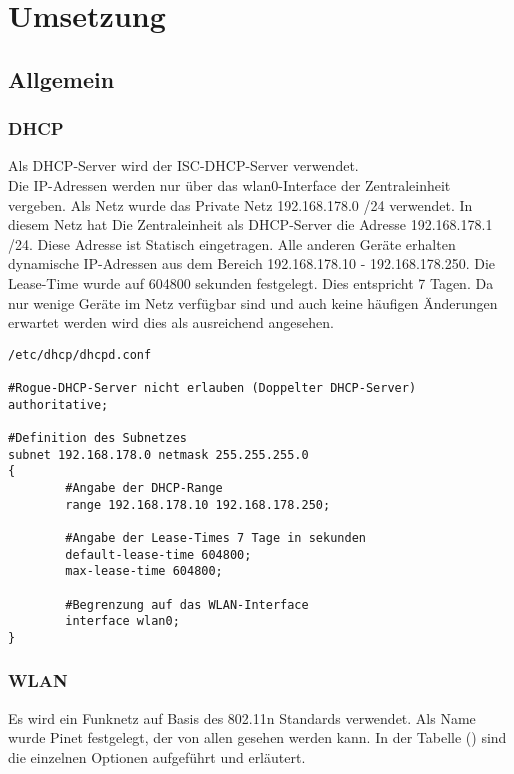 \chapter{Umsetzung}

\section{Allgemein}

\subsection{DHCP}

Als DHCP-Server wird der ISC-DHCP-Server verwendet.\\
Die IP-Adressen werden nur über das wlan0-Interface der Zentraleinheit vergeben.
Als Netz wurde das Private Netz 192.168.178.0 /24 verwendet. In diesem Netz hat
Die Zentraleinheit als DHCP-Server die Adresse 192.168.178.1 /24. Diese Adresse
ist Statisch eingetragen. Alle anderen Geräte erhalten dynamische IP-Adressen
aus dem Bereich 192.168.178.10 - 192.168.178.250. Die Lease-Time wurde auf
604800 sekunden festgelegt. Dies entspricht 7 Tagen. Da nur wenige Geräte im
Netz verfügbar sind und auch keine häufigen Änderungen erwartet werden wird dies
als ausreichend angesehen.

\begin{verbatim}
/etc/dhcp/dhcpd.conf

#Rogue-DHCP-Server nicht erlauben (Doppelter DHCP-Server)
authoritative;

#Definition des Subnetzes
subnet 192.168.178.0 netmask 255.255.255.0
{
        #Angabe der DHCP-Range
        range 192.168.178.10 192.168.178.250;

        #Angabe der Lease-Times 7 Tage in sekunden
        default-lease-time 604800;
        max-lease-time 604800;

        #Begrenzung auf das WLAN-Interface
        interface wlan0;
}

\end{verbatim}


\subsection{WLAN}

Es wird ein Funknetz auf Basis des 802.11n Standards verwendet. Als Name wurde
Pinet festgelegt, der von allen gesehen werden kann. In der Tabelle
() sind die einzelnen Optionen
aufgeführt und erläutert.


